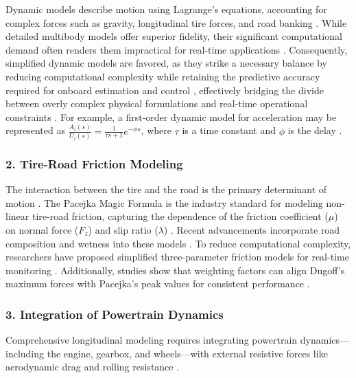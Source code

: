 \documentclass{article}
\begin{document}
Dynamic models describe motion using Lagrange’s equations, accounting for complex forces such as gravity, longitudinal tire forces, and road banking  \parencite[]{ahmad_reda_cbda68dd, st_phanie_lef_vre_3d7e9125}. While detailed multibody models offer superior fidelity, their significant computational demand often renders them impractical for real-time applications  \parencite{sebastian_s__james_30b34609}. Consequently, simplified dynamic models are favored, as they strike a necessary balance by reducing computational complexity while retaining the predictive accuracy required for onboard estimation and control  \parencite[]{sebastian_s__james_30b34609, nour_khoudari_2d5bcaad}, effectively bridging the divide between overly complex physical formulations and real-time operational constraints  \parencite{naser_sina_57baad9a}. For example, a first-order dynamic model for acceleration may be represented as $\frac{A_i(s)}{U_i(s)} = \frac{1}{\tau s+1}e^{-\phi s}$, where $\tau$ is a time constant and $\phi$ is the delay  \parencite{yuan_lin_f9c33bc8}.
\subsubsection{2. Tire-Road Friction Modeling}

The interaction between the tire and the road is the primary determinant of motion  \parencite{li_li_e87c1347}. The Pacejka Magic Formula is the industry standard for modeling non-linear tire-road friction, capturing the dependence of the friction coefficient ($\mu$) on normal force ($F_z$) and slip ratio ($\lambda$)  \parencite{stefan_solyom_af9d1023}. Recent advancements incorporate road composition and wetness into these models  \parencite{juan_antonio_cabrera_carrillo_c377413b}. To reduce computational complexity, researchers have proposed simplified three-parameter friction models for real-time monitoring  \parencite{mingyuan_bian_8e97af29}. Additionally, studies show that weighting factors can align Dugoff’s maximum forces with Pacejka’s peak values for consistent performance  \parencite{jorge_villagr__ab55ab3b}.
\subsubsection{3. Integration of Powertrain Dynamics}

Comprehensive longitudinal modeling requires integrating powertrain dynamics—including the engine, gearbox, and wheels—with external resistive forces like aerodynamic drag and rolling resistance  \parencite[]{jo_ko_deur_7287661a, payman_shakouri_efa9b2b2}. 
\end{document}
